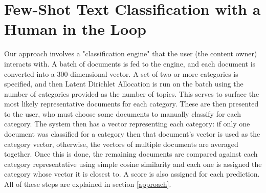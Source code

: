 \documentclass{article} %
\begin{document}
\section{Few-Shot Text Classification with a Human in the Loop}
Our approach involves a "classification engine" that the user (the content owner) interacts with. A batch of documents is fed to the engine, and each document is converted into a 300-dimensional vector. A set of two or more categories is specified, and then Latent Dirichlet Allocation is run on the batch using the number of categories provided as the number of topics. This serves to surface the most likely representative documents for each category. These are then presented to the user, who must choose some documents to manually classify for each category. The system then has a vector representing each category: if only one document was classified for a category then that document's vector is used as the category vector, otherwise, the vectors of multiple documents are averaged together. Once this is done, the remaining documents are compared against each category representative using simple cosine similarity and each one is assigned the category whose vector it is closest to. A score is also assigned for each prediction. All of these steps are explained in section \ref{approach}.











\end{document}
